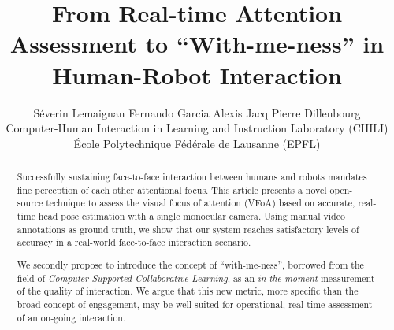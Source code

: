 \documentclass{sig-alternate}
\begin{document}
%

\title{From Real-time Attention Assessment to ``With-me-ness'' in Human-Robot Interaction}
\author{Séverin Lemaignan \qquad Fernando Garcia \qquad Alexis Jacq \qquad Pierre Dillenbourg\\Computer-Human Interaction in Learning and Instruction Laboratory (CHILI)\\École Polytechnique Fédérale de Lausanne (EPFL)}


\maketitle
\begin{abstract}

Successfully sustaining face-to-face interaction between humans and robots
mandates fine perception of each other attentional focus. This article presents
a novel open-source technique to assess the visual focus of attention (VFoA)
based on accurate, real-time head pose estimation with a single monocular
camera.  Using manual video annotations as ground truth, we show that our system
reaches satisfactory levels of accuracy in a real-world face-to-face interaction
scenario.

We secondly propose to introduce the concept of ``with-me-ness'', borrowed from the
field of {\it Computer-Supported Collaborative Learning}, as an
\emph{in-the-moment} measurement of the quality of interaction. We argue that
this new metric, more specific than the broad concept of engagement, may be well
suited for operational, real-time assessment of an on-going interaction.

\end{abstract}



\end{document}
